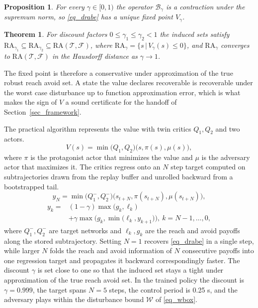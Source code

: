 \documentclass[5p,times,authoryear]{elsarticle}
\newtheorem{proposition}{Proposition}
\newtheorem{theorem}{Theorem}
\begin{document}
\begin{proposition}\label{prop_contraction}
For every $\gamma\in[0,1)$ the operator $\mathcal{B}_\gamma$ is a contraction under the supremum norm, so \eqref{eq_drabe} has a unique fixed point $V_\gamma$.
\end{proposition}
\begin{theorem}\label{thm_underapprox}
For discount factors $0\le\gamma_1\le\gamma_2<1$ the induced sets satisfy $\mathrm{RA}_{\gamma_1}\subseteq\mathrm{RA}_{\gamma_2}\subseteq\mathrm{RA}(\mathcal{T},\mathcal{F})$, where $\mathrm{RA}_{\gamma}=\{s\,|\,V_\gamma(s)\le 0\}$, and $\mathrm{RA}_{\gamma}$ converges to $\mathrm{RA}(\mathcal{T},\mathcal{F})$ in the Hausdorff distance as $\gamma\to 1$.
\end{theorem}
The fixed point is therefore a conservative under approximation of the true robust reach avoid set. A state the value declares recoverable is recoverable under the worst case disturbance up to function approximation error, which is what makes the sign of $V$ a sound certificate for the handoff of Section~\ref{sec_framework}.

The practical algorithm represents the value with twin critics $Q_1, Q_2$ and two actors.
\begin{equation}\label{eq_value}
V(s) = \min\big(Q_1, Q_2\big)\big(s, \pi(s), \mu(s)\big),
\end{equation}
where $\pi$ is the protagonist actor that minimizes the value and $\mu$ is the adversary actor that maximizes it. The critics regress onto an $N$ step target computed on subtrajectories drawn from the replay buffer and unrolled backward from a bootstrapped tail.
\begin{equation}
y_N = \min\big(Q_1^{-}, Q_2^{-}\big)\big(s_{t+N}, \pi(s_{t+N}), \mu(s_{t+N})\big),
\end{equation}
\begin{equation}
\begin{aligned}
y_k = {}& (1-\gamma)\max\big(g_k, \ell_k\big) \\
&+ \gamma\max\Big(g_k, \min\big(\ell_k, y_{k+1}\big)\Big),\ k = N-1, \dots, 0,
\end{aligned}
\end{equation}
where $Q_1^{-}, Q_2^{-}$ are target networks and $\ell_k, g_k$ are the reach and avoid payoffs along the stored subtrajectory. Setting $N=1$ recovers \eqref{eq_drabe} in a single step, while larger $N$ folds the reach and avoid information of $N$ consecutive payoffs into one regression target and propagates it backward correspondingly faster. The discount $\gamma$ is set close to one so that the induced set stays a tight under approximation of the true reach avoid set. %
In the trained policy the discount is $\gamma=0.999$, the target spans $N=5$ steps, the control period is 0.25 s, and the adversary plays within the disturbance bound $\mathcal{W}$ of \eqref{eq_wbox}.
\end{document}
